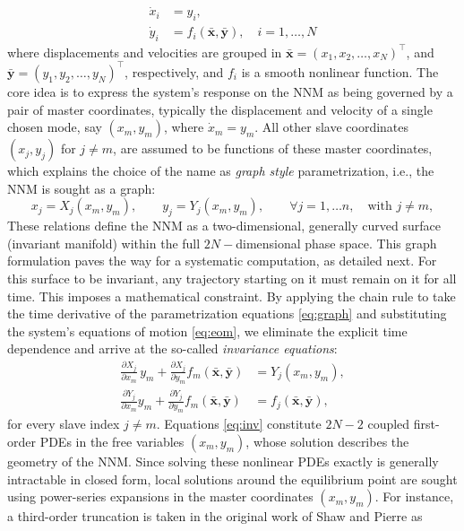 \documentclass[a4paper,9pt,parskip=half,english]{article}
\theoremstyle{plain}
\theoremstyle{definition}
\newcommand{\T}{^{\!\top}} %
\newcommand{\vx}{\mathbf x}
\newcommand{\vy}{\mathbf y}
\begin{document}
\begin{equation}
\begin{aligned}
\dot{x}_i &= y_i, \\
\dot{y}_i &= f_i(\bar{\vx}, \bar{\vy}), \quad i = 1,\ldots, N
\end{aligned}\label{eq:eom}
\end{equation}
where displacements and velocities are grouped in $\bar{\vx}=(x_1, x_2, \ldots, x_N)\T$, and $\bar{\vy} = (y_1,y_2,\ldots,y_N)\T$, respectively, and $f_i$ is a smooth nonlinear function. The core idea is to express the system's response on the NNM as being governed by a pair of master coordinates, typically the displacement and velocity of a single chosen mode, say $(x_m, y_m)$, where $\dot{x}_m=y_m$. All other slave coordinates $(x_j,y_j)$ for $j\neq m$, are assumed to be functions of these master coordinates, which explains the choice of the name as \textit{graph style} parametrization, i.e., the NNM is sought as a graph: 
\begin{equation}
x_{j}=X_{j}(x_{m},y_{m}),\qquad
y_{j}=Y_{j}(x_{m},y_{m}),\qquad \forall j = 1, \ldots n, \quad \mbox{with } j \neq m,
\label{eq:graph}
\end{equation}
These relations define the NNM as a two-dimensional, generally curved surface (invariant manifold) within the full $2N-$dimensional phase space. This graph formulation paves the way for a systematic computation, as detailed next. For this surface to be invariant, any trajectory starting on it must remain on it for all time. This imposes a mathematical constraint. By applying the chain rule to take the time derivative of the parametrization equations \eqref{eq:graph} and substituting the system's equations of motion \eqref{eq:eom}, we eliminate the explicit time dependence and arrive at the so-called \textit{invariance equations}:
\begin{equation}\label{eq:inv}
	\begin{aligned}
		\frac{\partial X_{j}} {\partial x_{m}} \, y_{m}
		+\frac{\partial X_{j}}{\partial y_{m}} f_{m}(\bar{\vx},\bar{\vy})
		&=Y_{j}(x_{m},y_{m}), \\  
		\frac{\partial Y_{j}}{\partial x_{m}} y_{m}
		+\frac{\partial Y_{j}}{\partial y_{m}} f_{m}(\bar{\vx},\bar{\vy})
		&= f_{j}(\bar{\vx},\bar{\vy}),
	\end{aligned}
\end{equation}
for every slave index $j \neq m$. Equations \eqref{eq:inv} constitute $2N-2$
coupled first-order PDEs in the free variables $(x_m,y_m)$, whose solution describes the geometry of the NNM. Since solving these nonlinear PDEs exactly is generally intractable in closed form, local solutions around the equilibrium point are sought using power-series expansions in the master coordinates $(x_m, y_m)$. For instance, a third-order truncation is taken in the original work of Shaw and Pierre \cite{Shaw1993} as
\end{document}
